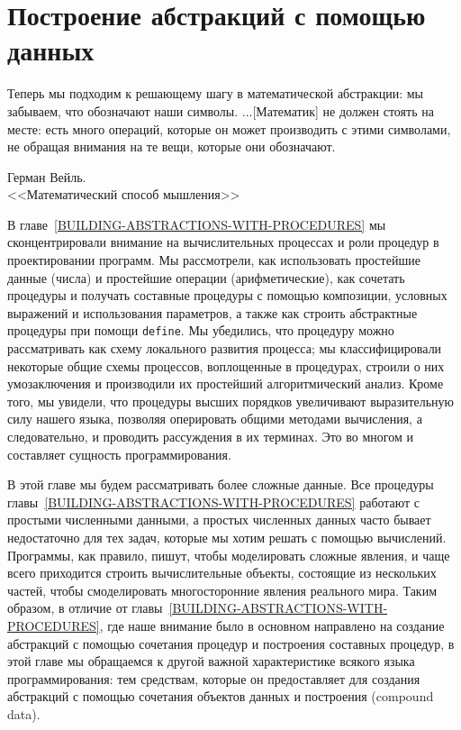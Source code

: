 \chapter{Построение абстракций с помощью данных}
\thispagestyle{empty}
\label{BUILDING-ABSTRACTIONS-WITH-DATA}
\epigraph{
Теперь мы подходим к решающему шагу в математической
абстракции: мы забываем, что обозначают наши символы. ...[Математик]
не должен стоять на месте: есть много операций, которые он может
производить с этими символами, не обращая внимания на те вещи, которые 
они обозначают.
}{Герман Вейль. \\ <<Математический способ мышления>>}

 В главе~\ref{BUILDING-ABSTRACTIONS-WITH-PROCEDURES}
мы сконцентрировали внимание на вычислительных процессах и роли
процедур в проектировании программ.  Мы рассмотрели, как использовать
простейшие данные (числа) и простейшие операции (арифметические), как
сочетать процедуры и получать составные процедуры с помощью
композиции, условных выражений и использования параметров, а
также как строить абстрактные процедуры при помощи
{\tt define}.  Мы убедились, что процедуру можно рассматривать
как схему локального развития процесса; мы классифицировали некоторые
общие схемы процессов, воплощенные в процедурах,
строили о них умозаключения и производили их простейший алгоритмический
анализ. Кроме того, 
мы увидели, что процедуры высших порядков увеличивают выразительную
силу нашего 
языка, позволяя оперировать общими методами вычисления, а
следовательно, и проводить рассуждения в их терминах. Это во многом и
составляет сущность программирования.

В этой главе мы будем рассматривать более сложные
данные.
Все процедуры главы~\ref{BUILDING-ABSTRACTIONS-WITH-PROCEDURES} работают с
простыми численными данными, а простых численных данных часто бывает
недостаточно для тех задач, которые мы хотим решать с помощью
вычислений.  Программы, как правило, пишут, чтобы моделировать сложные 
явления, и чаще всего приходится строить вычислительные объекты,
состоящие из нескольких частей, чтобы смоделировать многосторонние
явления реального мира.  Таким образом, в отличие от главы~\ref{BUILDING-ABSTRACTIONS-WITH-PROCEDURES}, где наше внимание
было в основном направлено на создание абстракций с помощью
сочетания процедур и построения составных процедур, в этой главе мы
обращаемся к другой важной характеристике всякого языка
программирования: тем средствам, которые он предоставляет для создания
абстракций с помощью сочетания объектов данных и построения 
 (compound data).

